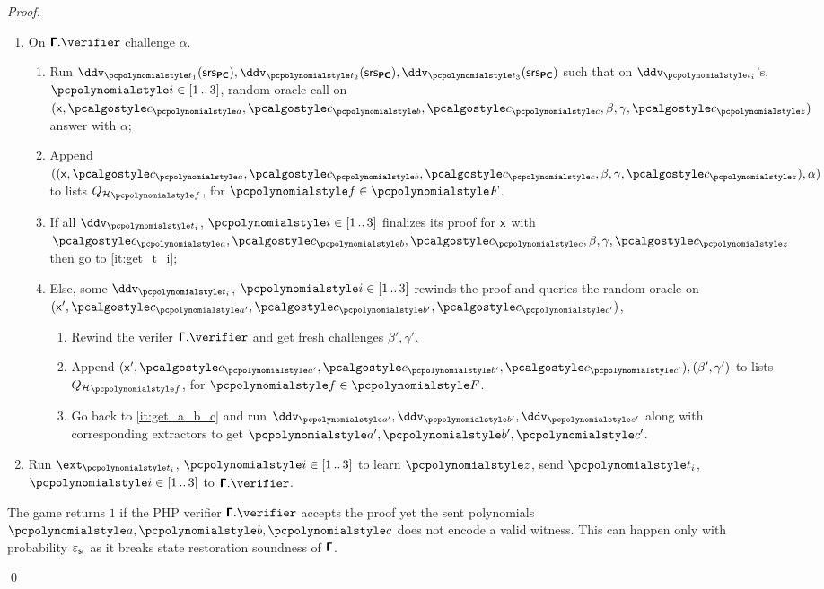 \documentclass[runningheads,11pt]{llncs}
\begin{document}
\begin{proof}
\begin{enumerate}
  \item On $\PHP.\verifier$ challenge $\alpha$.
     \begin{enumerate}
     \item Run
       $\ddv_{\p{t_1}}(\srsPC), \ddv_{\p{t_2}}(\srsPC), \ddv_{\p{t_3}}(\srsPC)$
       such that on $\ddv_{\p{t_i}}$'s, $\p{i} \in \range{1}{3}$, random oracle
       call on $(\inp, \cp{a}, \cp{b}, \cp{c}, \beta, \gamma, \cp{z})$ answer
       with $\alpha$;
     \item Append
       $((\inp, \cp{a}, \cp{b}, \cp{c}, \beta, \gamma, \cp{z}), \alpha)$ to
       lists $\qro_{\p{f}}$, for $\p{f} \in \p{F}$.
     \item If all $\ddv_{\p{t_i}}$, $\p{i} \in \range{1}{3}$ finalizes its proof
       for $\mathsf{x}$ with $\cp{a}, \cp{b}, \cp{c}, \beta, \gamma, \cp{z}$ then go
       to \cref{it:get_t_i};
     \item Else, some $\ddv_{\p{t_i}}$, $\p{i} \in \range{1}{3}$ rewinds the
       proof and queries the random oracle on
       $(\inp', \cp{a'}, \cp{b'}, \cp{c'})$,
      \begin{enumerate}
      \item Rewind the verifer $\PHP.\verifier$ and get fresh challenges
        $\beta', \gamma'$.
      \item Append $(\inp', \cp{a'}, \cp{b'}, \cp{c'}), (\beta', \gamma')$ to
        lists $\qro_{\p{f}}$, for $\p{f} \in \p{F}$.
      \item Go back to \cref{it:get_a_b_c} and run
        $\ddv_{\p{a'}}, \ddv_{\p{b'}}, \ddv_{\p{c'}}$ along with corresponding
        extractors to get $\p{a'}, \p{b'}, \p{c'}$.
      \end{enumerate}
    \end{enumerate}
  \item \label{it:get_t_i} Run $\ext_{\p{t_i}}$, $\p{i} \in \range{1}{3}$ to learn $\p{z}$, send
    $\p{t_i}$, $\p{i} \in \range{1}{3}$ to $\PHP.\verifier$.
  \end{enumerate}
  The game returns $1$ if the PHP verifier $\PHP.\verifier$ accepts the proof
  yet the sent polynomials $\p{a}, \p{b}, \p{c}$ does not encode a valid
  witness. This can happen only with probability $\varepsilon_{\mathsf{sr}}$ as it breaks
  state restoration soundness of $\bm{\mathsf{\Gamma}}$.

  \qed
    \end{proof}
\end{document}
